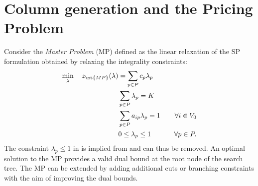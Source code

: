 \section{Column generation and the Pricing Problem}
\label{sec:column-generation-and-pricing-problem}

Consider the \textit{Master Problem} (MP) defined
as the linear relaxation of the SP formulation
obtained by relaxing the integrality constraints:
\begin{align}
	\min_{\lambda} \quad z_\mt{MP}(\lambda) & = \sum_{p \in P}  c_p \lambda_p      & \label{eq:mp-obj-func}                                                                                                    \\
	                                        & \sum_{p \in P} \lambda_{p} = K       & \label{eq:mp-K-routes}                                                                                                    \\
	                                        & \sum_{p \in P}  a_{ip} \lambda_p = 1 & \quad \forall i \in V_0                                              \label{eq:mp-customers-visited-by-exactly-one-route} \\
	                                        & 0 \le \lambda_p \le 1                & \quad \forall p \in P \label{eq:mp-lambda-mip-var-bounds}.
\end{align}
The constraint $\lambda_p \le 1$ in 
is implied from  and can thus be removed.
An optimal solution to the MP provides a valid dual bound at the root node of the search tree.
The MP can be extended by adding additional cuts or branching constraints
with the aim of improving the dual bounds.

